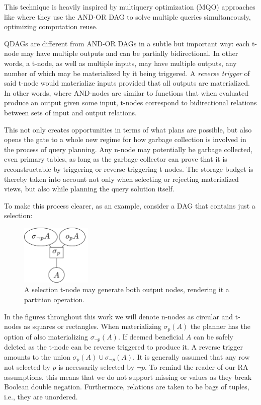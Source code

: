 This technique is 
heavily inspired by multiquery optimization (MQO) approaches like
\cite{mistryMaterializedViewSelection2001} where they use the AND-OR DAG
to solve multiple queries simultaneously, optimizing computation reuse.

QDAGs are different from AND-OR DAGs in a subtle but important way:
each t-node may have multiple outputs and can be partially
bidirectional. In other words, a t-node, as well as multiple inputs,
may have multiple outputs, any number of which may be materialized by
it being triggered. A \emph{reverse trigger} of said t-node would
materialize inputs provided that all outputs are materialized. In
other words, where AND-nodes are similar to functions that when
evaluated produce an output given some input, t-nodes correspond to
bidirectional relations between sets of input and output
relations. 

This not only creates opportunities in terms of what plans
are possible, but also opens the gate to a whole new regime for how
garbage collection is involved in the process of query planning. Any
n-node may potentially be garbage collected, even primary tables, as
long as the garbage collector can prove that it is reconstructable by
triggering or reverse triggering t-nodes. The storage budget is
thereby taken into account not only when selecting or rejecting
materialized views, but also while planning the query solution
itself. 

To make this process clearer, as an example, consider a DAG that
contains just a selection:

\begin{figure}[H]
  \centering
  \includegraphics[width=0.3\textwidth]{./imgs/selnet.pdf}
  \caption{A selection t-node may generate both output nodes,
    rendering it a partition operation.}
\end{figure}

In the figures throughout this work we will denote n-nodes as
circular and t-nodes as squares or rectangles. When materializing
\(\sigma_p(A)\) the planner has the option of also materializing
\(\sigma_{\neg p}(A)\). If deemed beneficial \(A\) can be safely
deleted as the t-node can be reverse triggered to produce it. A
reverse trigger amounts to the union \(\sigma_{p}(A) \cup
\sigma_{\neg p}(A)\). It is generally assumed
that any row not selected by \(p\) is necessarily selected by \(\neg
p\). To remind the reader of our RA assumptions, 
this means that we do not support missing or  values as
they break Boolean double negation. Furthermore, relations are taken
to be bags of tuples, i.e., they are unordered.

